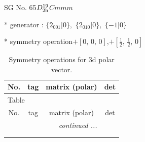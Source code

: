 \documentclass[fleqn,8pt]{jsarticle}
\begin{document}
\setcounter{MaxMatrixCols}{32}

\renewcommand{\tablename}{Table~}
\renewcommand{\figurename}{Figure~}
\begin{center}
\LARGE
SG No. 65\quad$D_{\rm 2h}^{19}$\quad$Cmmm$\quad[ orthorhombic ]
\end{center}

* generator : $\{2{}_{001}|0\},\,\,\{2{}_{010}|0\},\,\,\{-1|0\}$

* symmetry operation\quad$+\left[ 0,\, 0,\, 0 \right]$,\quad $+\left[ \frac{1}{2},\, \frac{1}{2},\, 0 \right]$
\renewcommand{\arraystretch}{1.3}
\begin{longtable}{cccc}
\caption{Symmetry operations for 3d polar vector.}
 \\
 \hline \hline
No. & tag & matrix (polar) & det \\ \hline \endfirsthead

\multicolumn{3}{l}{\tablename\ \thetable{}} \\
 \hline \hline
No. & tag & matrix (polar) & det \\ \hline \endhead

 \hline \hline
\multicolumn{3}{r}{\footnotesize\it continued ...} \\ \endfoot

 \hline \hline
\multicolumn{3}{r}{} \\ \endlastfoot


\end{longtable}
\end{document}
